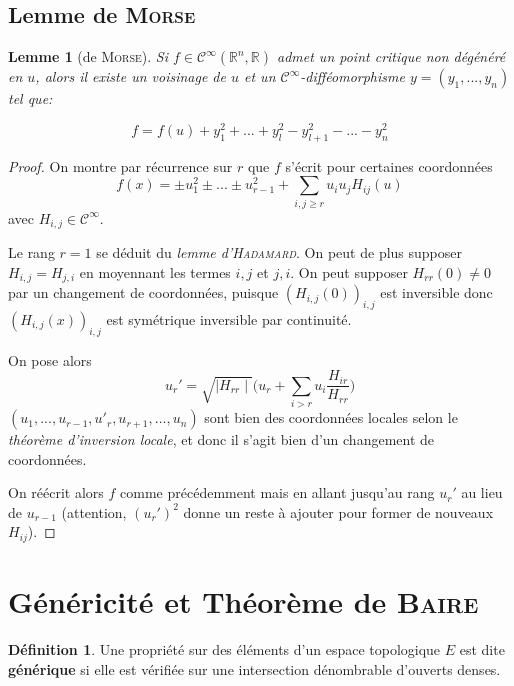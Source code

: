 \documentclass[a4paper]{article}
\newcommand{\cinf}{\mathcal{C}^\infty}
\newcommand{\R}{\mathbb{R}}
\newtheorem{lemm}{Lemme}
\theoremstyle{definition}
\newtheorem{defn}{Définition}
\begin{document}
\subsection{Lemme de \textsc{Morse}}
\begin{lemm}[de \textsc{Morse}]
	Si $f\in\cinf(\R^n,\R)$ admet un point critique non dégénéré en $u$, alors il existe un voisinage de $u$ et un $\cinf$-difféomorphisme $y=(y_1,...,y_n)$ tel que:

	$$f=f(u)+y_1^2+...+y_l^2-y_{l+1}^2-...-y_n^2$$
\end{lemm}
\begin{proof}
	On montre par récurrence sur $r$ que $f$ s'écrit pour certaines coordonnées
	$$f(x)=\pm u_1^2 \pm...\pm u_{r-1}^2 + \sum_{i,j\geq r} u_iu_jH_{ij}(u)$$
	avec $H_{i,j}\in\cinf$.

	Le rang $r=1$ se déduit du \textit{lemme d'\textsc{Hadamard}}. On peut de plus supposer $H_{i,j}=H_{j,i}$ en moyennant les termes $i,j$ et $j,i$.
	On peut supposer $H_{rr}(0)\neq0$ par un changement de coordonnées, puisque $(H_{i,j}(0))_{i,j}$ est inversible donc $(H_{i,j}(x))_{i,j}$ est symétrique inversible par continuité.

	On pose alors $$u_r' =\sqrt{\mid H_{rr}\mid}\big(u_r+\sum_{i>r}u_i\frac{H_{ir}}{H_{rr}}\big)$$
	$(u_1,...,u_{r-1},u'_r,u_{r+1},...,u_n)$ sont bien des coordonnées locales selon le \textit{théorème d'inversion locale}, et donc il s'agit bien d'un changement de coordonnées.

	On réécrit alors $f$ comme précédemment mais en allant jusqu'au rang $u_r'$ au lieu de $u_{r-1}$ (attention, $(u_r')^2$ donne un reste à ajouter pour former de nouveaux $H_{ij}$).
\end{proof}

\section{Généricité et Théorème de \textsc{Baire}}
\begin{defn}
	Une propriété sur des éléments d'un espace topologique $E$ est dite \textbf{générique} si elle est vérifiée sur une intersection dénombrable d'ouverts denses.
\end{defn}
\end{document}
